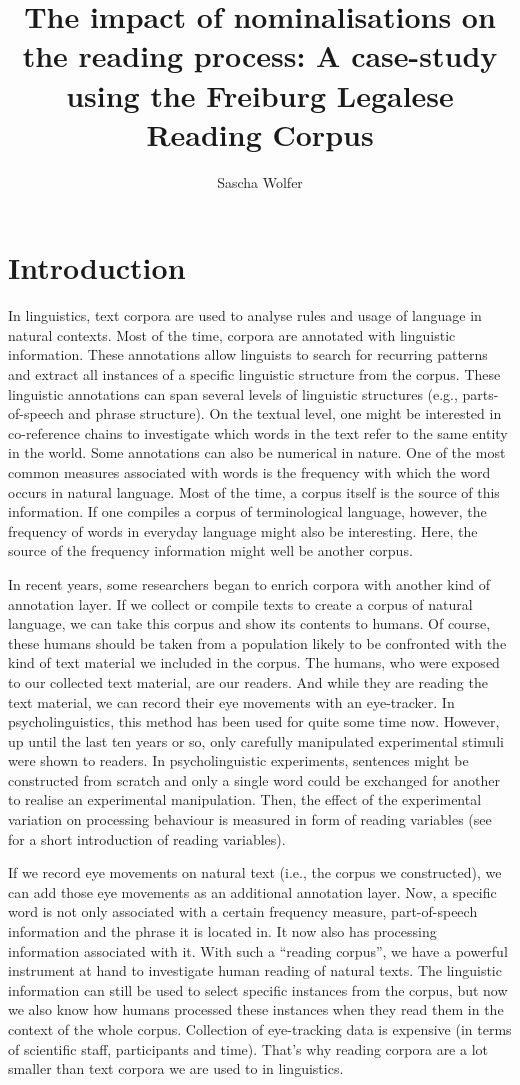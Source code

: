 \documentclass[output=paper]{langsci/langscibook}
\author{%
Sascha Wolfer\affiliation{Institute for the German Language, Mannheim}
}
\title{The impact of nominalisations on the reading process: {A} case-study using the Freiburg Legalese Reading Corpus}
\begin{document}
\section{Introduction}

In linguistics, text corpora are used to analyse rules and usage of language in natural contexts. Most of the time, corpora are annotated with linguistic information. These annotations allow linguists to search for recurring patterns and extract all instances of a specific linguistic structure from the corpus. These linguistic annotations can span several levels of linguistic structures (e.g., parts-of-speech and phrase structure). On the textual level, one might be interested in co-reference chains to investigate which words in the text refer to the same entity in the world. Some annotations can also be numerical in nature. One of the most common measures associated with words is the frequency with which the word occurs in natural language. Most of the time, a corpus itself is the source of this information. If one compiles a corpus of terminological language, however, the frequency of words in everyday language might also be interesting. Here, the source of the frequency information might well be another corpus.

In recent years, some researchers began to enrich corpora with another kind of annotation layer. If we collect or compile texts to create a corpus of natural language, we can take this corpus and show its contents to humans. Of course, these humans should be taken from a population likely to be confronted with the kind of text material we included in the corpus. The humans, who were exposed to our collected text material, are our readers. And while they are reading the text material, we can record their eye movements with an eye-tracker. In psycholinguistics, this method has been used for quite some time now. However, up until the last ten years or so, only carefully manipulated experimental stimuli were shown to readers. In psycholinguistic experiments, sentences might be constructed from scratch and only a single word could be exchanged for another to realise an experimental manipulation. Then, the effect of the experimental variation on processing behaviour is measured in form of reading variables (see  for a short introduction of reading variables). 

If we record eye movements on natural text (i.e., the corpus we constructed), we can add those eye movements as an additional annotation layer. Now, a specific word is not only associated with a certain frequency measure, part-of-speech information and the phrase it is located in. It now also has processing information associated with it. With such a “reading corpus”, we have a powerful instrument at hand to investigate human reading of natural texts. The linguistic information can still be used to select specific instances from the corpus, but now we also know how humans processed these instances when they read them in the context of the whole corpus. Collection of eye-tracking data is expensive (in terms of scientific staff, participants and time). That’s why reading corpora are a lot smaller than text corpora we are used to in linguistics.
\end{document}
